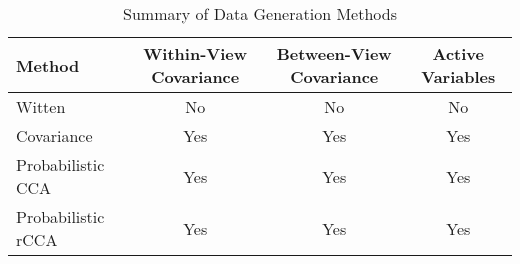 \begin{table}[h]
    \centering
    \caption{Summary of Data Generation Methods}
    \begin{tabular}{l|c|c|c|}
        \textbf{Method} & \textbf{Within-View Covariance} & \textbf{Between-View Covariance} & \textbf{Active
        Variables} \\
        \hline
        Witten           & No                              & No                               & No                        \\
        Covariance       & Yes                             & Yes                              & Yes                       \\
        Probabilistic CCA & Yes                             & Yes                              & Yes                       \\
        Probabilistic rCCA & Yes                             & Yes                              & Yes                       \\
        \hline
    \end{tabular}
    \label{table:data-generation-methods-properties}
\end{table}


